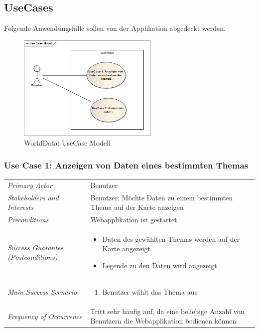 \subsection{UseCases}
Folgende Anwendungsfälle sollen von der Applikation abgedeckt werden.

\begin{figure}[H]
	\centering
	\includegraphics[width=0.6\textwidth]{images/usecase1-worlddata/uml/worlddata-usecasemodel}
	\caption{WorldData: UseCase Modell}
	\label{worlddata-usecasemodel}
\end{figure}

\subsubsection{Use Case 1: Anzeigen von Daten eines bestimmten Themas}

\renewcommand{\arraystretch}{2}
\begin{longtable}{p{0.25\twocelltabwidth}p{0.75\twocelltabwidth}}
\textit{Primary Actor} & Benutzer \\ 
\textit{Stakeholders and Interests} & Benutzer: Möchte Daten zu einem bestimmten Thema auf der Karte anzeigen \\ 
\textit{Preconditions} & Webapplikation ist gestartet \\ 
\textit{Success Guarantee (Postconditions)} & \begin{itemize}[noitemsep, nosep, leftmargin=12pt, before*={\mbox{}\vspace{-\baselineskip}}, after*={\mbox{}\vspace{-\baselineskip}}]
\item Daten des gewählten Themas werden auf der Karte angezeigt
\item Legende zu den Daten wird angezeigt
\end{itemize} \\ 
\textit{Main Success Scenario} & \begin{enumerate}[noitemsep, nosep, leftmargin=12pt, before*={\mbox{}\vspace{-\baselineskip}}, after*={\mbox{}\vspace{-\baselineskip}}]
\item Benutzer wählt das Thema aus
\end{enumerate} \\ 
\textit{Frequency of Occurrence} & Tritt sehr häufig auf, da eine beliebige Anzahl von Benutzern die Webapplikation bedienen können \\ 
\end{longtable} 
\renewcommand{\arraystretch}{1.3}

